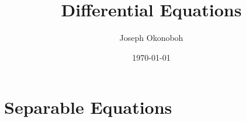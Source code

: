 \documentclass[9pt]{book}
\title{\vspace{-14cm}Differential Equations}
\author{Joseph Okonoboh}
\date{\today}
\begin{document}
   \maketitle
\begin{comment}   
   \begingroup
   \let\cleardoublepage\clearpage
   \tableofcontents
   \endgroup

   \chapter{Introduction}
   \setcounter{section}{2}
      \section{Classification of Differential Equations}
         
         

   \chapter{First Order Differential Equations}
      \section{Linear Equations; Method of Integrating Factors}
         
      \section{Separable Equations}
         
      \section{Modeling with First Order Equations}
         
\end{comment}
      \section{Separable Equations}
         
\end{document}
